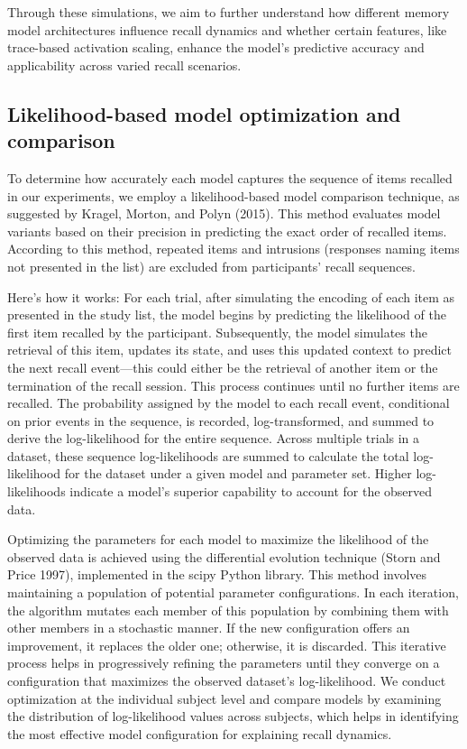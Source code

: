 \documentclass[
  letterpaper,
  11pt,
  english,
  singlespacing,
  headsepline]{MastersDoctoralThesis}
\begin{document}
Through these simulations, we aim to further understand how different
memory model architectures influence recall dynamics and whether certain
features, like trace-based activation scaling, enhance the model's
predictive accuracy and applicability across varied recall scenarios.

\subsection{Likelihood-based model optimization and
comparison}\label{likelihood-based-model-optimization-and-comparison}

To determine how accurately each model captures the sequence of items
recalled in our experiments, we employ a likelihood-based model
comparison technique, as suggested by Kragel, Morton, and Polyn (2015).
This method evaluates model variants based on their precision in
predicting the exact order of recalled items. According to this method,
repeated items and intrusions (responses naming items not presented in
the list) are excluded from participants' recall sequences.

Here's how it works: For each trial, after simulating the encoding of
each item as presented in the study list, the model begins by predicting
the likelihood of the first item recalled by the participant.
Subsequently, the model simulates the retrieval of this item, updates
its state, and uses this updated context to predict the next recall
event---this could either be the retrieval of another item or the
termination of the recall session. This process continues until no
further items are recalled. The probability assigned by the model to
each recall event, conditional on prior events in the sequence, is
recorded, log-transformed, and summed to derive the log-likelihood for
the entire sequence. Across multiple trials in a dataset, these sequence
log-likelihoods are summed to calculate the total log-likelihood for the
dataset under a given model and parameter set. Higher log-likelihoods
indicate a model's superior capability to account for the observed data.

Optimizing the parameters for each model to maximize the likelihood of
the observed data is achieved using the differential evolution technique
(Storn and Price 1997), implemented in the scipy Python library. This
method involves maintaining a population of potential parameter
configurations. In each iteration, the algorithm mutates each member of
this population by combining them with other members in a stochastic
manner. If the new configuration offers an improvement, it replaces the
older one; otherwise, it is discarded. This iterative process helps in
progressively refining the parameters until they converge on a
configuration that maximizes the observed dataset's log-likelihood. We
conduct optimization at the individual subject level and compare models
by examining the distribution of log-likelihood values across subjects,
which helps in identifying the most effective model configuration for
explaining recall dynamics.
\end{document}
